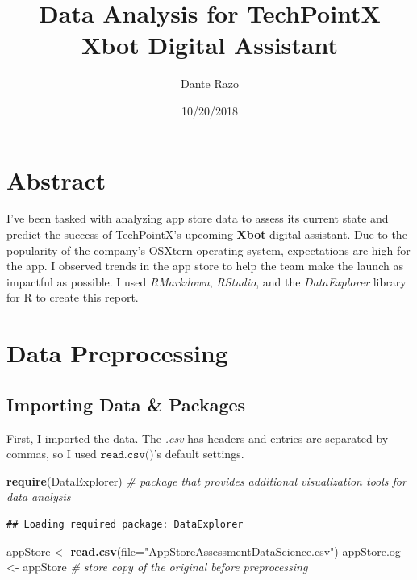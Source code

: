 \documentclass[]{article}
\title{Data Analysis for TechPointX Xbot Digital Assistant}
\author{Dante Razo}
\date{10/20/2018}
\newenvironment{Shaded}{\begin{snugshade}}{\end{snugshade}}
\newcommand{\KeywordTok}[1]{\textcolor[rgb]{0.13,0.29,0.53}{\textbf{#1}}}
\newcommand{\DataTypeTok}[1]{\textcolor[rgb]{0.13,0.29,0.53}{#1}}
\newcommand{\StringTok}[1]{\textcolor[rgb]{0.31,0.60,0.02}{#1}}
\newcommand{\CommentTok}[1]{\textcolor[rgb]{0.56,0.35,0.01}{\textit{#1}}}
\newcommand{\NormalTok}[1]{#1}
\begin{document}
\maketitle

\section{Abstract}\label{abstract}

I've been tasked with analyzing app store data to assess its current
state and predict the success of TechPointX's upcoming \textbf{Xbot}
digital assistant. Due to the popularity of the company's OSXtern
operating system, expectations are high for the app. I observed trends
in the app store to help the team make the launch as impactful as
possible. I used \emph{RMarkdown}, \emph{RStudio}, and the
\emph{DataExplorer} library for R to create this report.

\section{Data Preprocessing}\label{data-preprocessing}

\subsection{Importing Data \& Packages}\label{importing-data-packages}

First, I imported the data. The \emph{.csv} has headers and entries are
separated by commas, so I used \(\texttt{read.csv()}\)'s default
settings.

\begin{Shaded}
\begin{Highlighting}[]
\KeywordTok{require}\NormalTok{(DataExplorer)   }\CommentTok{# package that provides additional visualization tools for data analysis}
\end{Highlighting}
\end{Shaded}

\begin{verbatim}
## Loading required package: DataExplorer
\end{verbatim}

\begin{Shaded}
\begin{Highlighting}[]
\NormalTok{appStore <-}\StringTok{ }\KeywordTok{read.csv}\NormalTok{(}\DataTypeTok{file=}\StringTok{"AppStoreAssessmentDataScience.csv"}\NormalTok{)}
\NormalTok{appStore.og <-}\StringTok{ }\NormalTok{appStore }\CommentTok{# store copy of the original before preprocessing}
\end{Highlighting}
\end{Shaded}
\end{document}
